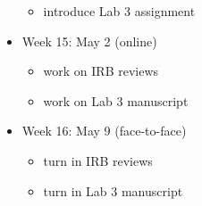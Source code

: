 \documentclass[10pt]{article}
\begin{document}
\begin{itemize}
\begin{itemize}
\item introduce Lab 3 assignment
\end{itemize}
\item Week 15: May 2 (online)
\begin{itemize}
\item work on IRB reviews
\item work on Lab 3 manuscript
\end{itemize}
\item Week 16: May 9 (face-to-face)
\begin{itemize}
\item turn in IRB reviews
\item turn in Lab 3 manuscript
\end{itemize}
\end{itemize}
\end{document}
